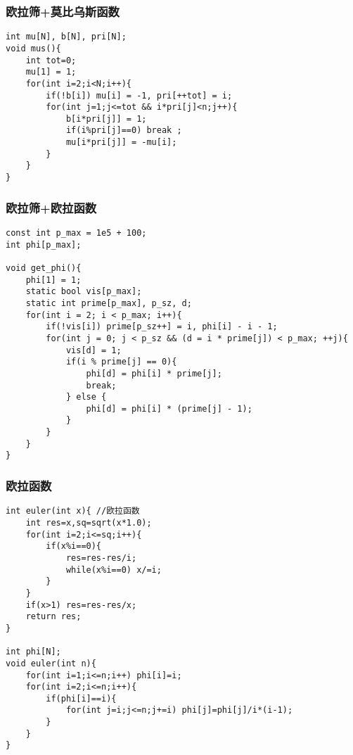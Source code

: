 \documentclass[]{article}
\begin{document}
\hypertarget{ux6b27ux62c9ux7b5bux83abux6bd4ux4e4cux65afux51fdux6570}{%
\subsubsection{欧拉筛+莫比乌斯函数}\label{ux6b27ux62c9ux7b5bux83abux6bd4ux4e4cux65afux51fdux6570}}

\begin{verbatim}
int mu[N], b[N], pri[N];
void mus(){
    int tot=0; 
    mu[1] = 1;
    for(int i=2;i<N;i++){
        if(!b[i]) mu[i] = -1, pri[++tot] = i;
        for(int j=1;j<=tot && i*pri[j]<n;j++){
            b[i*pri[j]] = 1;
            if(i%pri[j]==0) break ;
            mu[i*pri[j]] = -mu[i];
        }
    }
}
\end{verbatim}

\hypertarget{ux6b27ux62c9ux7b5bux6b27ux62c9ux51fdux6570}{%
\subsubsection{欧拉筛+欧拉函数}\label{ux6b27ux62c9ux7b5bux6b27ux62c9ux51fdux6570}}

\begin{verbatim}
const int p_max = 1e5 + 100;
int phi[p_max];

void get_phi(){
    phi[1] = 1;
    static bool vis[p_max];
    static int prime[p_max], p_sz, d;
    for(int i = 2; i < p_max; i++){
        if(!vis[i]) prime[p_sz++] = i, phi[i] - i - 1;
        for(int j = 0; j < p_sz && (d = i * prime[j]) < p_max; ++j){
            vis[d] = 1;
            if(i % prime[j] == 0){
                phi[d] = phi[i] * prime[j];
                break;
            } else {
                phi[d] = phi[i] * (prime[j] - 1);
            }
        }
    }
}
\end{verbatim}

\hypertarget{ux6b27ux62c9ux51fdux6570}{%
\subsubsection{欧拉函数}\label{ux6b27ux62c9ux51fdux6570}}

\begin{verbatim}
int euler(int x){ //欧拉函数
    int res=x,sq=sqrt(x*1.0);
    for(int i=2;i<=sq;i++){
        if(x%i==0){
            res=res-res/i;
            while(x%i==0) x/=i;
        }
    }
    if(x>1) res=res-res/x;
    return res;
}

int phi[N];
void euler(int n){
    for(int i=1;i<=n;i++) phi[i]=i;
    for(int i=2;i<=n;i++){
        if(phi[i]==i){
            for(int j=i;j<=n;j+=i) phi[j]=phi[j]/i*(i-1);
        }
    }
}

\end{verbatim}
\end{document}
